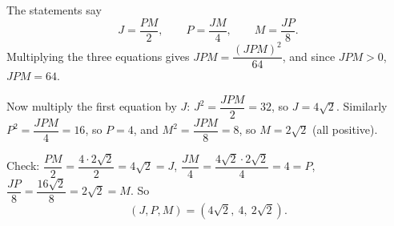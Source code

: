The statements say
\[
J=\dfrac{PM}{2},\qquad P=\dfrac{JM}{4},\qquad M=\dfrac{JP}{8}.
\]
Multiplying the three equations gives $JPM=\dfrac{(JPM)^2}{64}$, and since $JPM>0$, $JPM=64$.

Now multiply the first equation by $J$: $J^2=\dfrac{JPM}{2}=32$, so $J=4\sqrt2$. Similarly $P^2=\dfrac{JPM}{4}=16$, so $P=4$, and $M^2=\dfrac{JPM}{8}=8$, so $M=2\sqrt2$ (all positive).

Check: $\dfrac{PM}{2}=\dfrac{4\cdot2\sqrt2}{2}=4\sqrt2=J$, $\dfrac{JM}{4}=\dfrac{4\sqrt2\cdot2\sqrt2}{4}=4=P$, $\dfrac{JP}{8}=\dfrac{16\sqrt2}{8}=2\sqrt2=M$. So
\[
(J,P,M)=\boxed{\left(4\sqrt2,\ 4,\ 2\sqrt2\right)}.
\]
